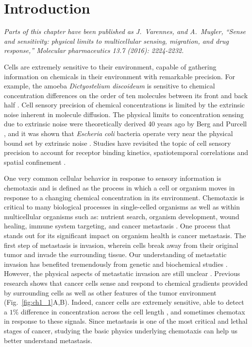 
\chapter{Introduction}

\textit{Parts of this chapter have been published as J.\ Varennes, and A.\ Mugler, ``Sense and sensitivity: physical limits to multicellular sensing, migration, and drug response,'' Molecular pharmaceutics 13.7 (2016): 2224-2232.}
\vspace{5mm}

\noindent
Cells are extremely sensitive to their environment, capable of gathering information on chemicals in their environment with remarkable precision. For example, the amoeba \textit{Dictyostelium discoideum} is sensitive to chemical concentration differences on the order of ten molecules between its front and back half \cite{song2006dictyostelium}. Cell sensory precision of chemical concentrations is limited by the extrinsic noise inherent in molecule diffusion. The physical limits to concentration sensing due to extrinsic noise were theoretically derived 40 years ago by Berg and Purcell \cite{berg1977physics}, and it was shown that \textit{Escheria coli} bacteria operate very near the physical bound set by extrinsic noise \cite{lan2012energy}. Studies have revisited the topic of cell sensory precision to account for receptor binding kinetics, spatiotemporal correlations and spatial confinement
\cite{bialek2005physical, kaizu2014berg, bicknell2015limits}.

One very common cellular behavior in response to sensory information is chemotaxis and is defined as the process in which a cell or organism moves in response to a changing chemical concentration in its environment. Chemotaxis is critical to many biological processes in single-celled organisms as well as within multicellular organisms such as: nutrient search, organism development, wound healing, immune system targeting, and cancer metastasis \cite{iglesias2008navigating,roussos2011chemotaxis}.
One process that stands out for its significant impact on organism health is cancer metastasis. The first step of metastasis is invasion, wherein cells break away from their original tumor and invade the surrounding tissue. Our understanding of metastatic invasion has benefited tremendously from genetic and biochemical studies \cite{leber2009molecular, hanahan2000hallmarks, hanahan2011hallmarks}. However, the physical aspects of metastatic invasion are still unclear \cite{hanahan2011hallmarks}. Previous research shows that cancer cells sense and respond to chemical gradients provided by surrounding cells
\cite{bhowmick2004stromal, condeelis2006macrophages, shields2007autologous, puliafito2015three} as well as other features of the tumor environment
\cite{shields2007autologous, polacheck2011interstitial, shieh2011regulation} (Fig.\ \ref{fig:ch1_1}A,B). Indeed, cancer cells are extremely sensitive, able to detect a $1\%$ difference in concentration across the cell length
\cite{shields2007autologous}, and sometimes chemotax in response to these signals. Since metastasis is one of the most critical and lethal stages of cancer, studying the basic physics underlying chemotaxis can help us better understand metastasis.

